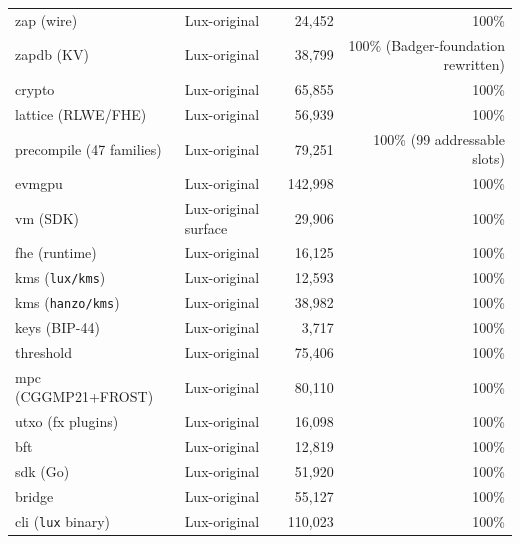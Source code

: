 \documentclass[11pt,a4paper]{article}
\begin{document}
\begin{table}[h]
\begin{tabular}{l l r r}
zap (wire)                 & Lux-original        &  24{,}452 & 100\% \\
zapdb (KV)                 & Lux-original        &  38{,}799 & 100\% (Badger-foundation rewritten) \\
crypto                     & Lux-original        &  65{,}855 & 100\% \\
lattice (RLWE/FHE)         & Lux-original        &  56{,}939 & 100\% \\
precompile (47 families)   & Lux-original        &  79{,}251 & 100\% (99 addressable slots) \\
evmgpu                     & Lux-original        & 142{,}998 & 100\% \\
vm (SDK)                   & Lux-original surface&  29{,}906 & 100\% \\
fhe (runtime)              & Lux-original        &  16{,}125 & 100\% \\
kms (\texttt{lux/kms})     & Lux-original        &  12{,}593 & 100\% \\
kms (\texttt{hanzo/kms})   & Lux-original        &  38{,}982 & 100\% \\
keys (BIP-44)              & Lux-original        &   3{,}717 & 100\% \\
threshold                  & Lux-original        &  75{,}406 & 100\% \\
mpc (CGGMP21+FROST)        & Lux-original        &  80{,}110 & 100\% \\
utxo (fx plugins)          & Lux-original        &  16{,}098 & 100\% \\
bft                        & Lux-original        &  12{,}819 & 100\% \\
sdk (Go)                   & Lux-original        &  51{,}920 & 100\% \\
bridge                     & Lux-original        &  55{,}127 & 100\% \\
cli (\texttt{lux} binary)  & Lux-original        & 110{,}023 & 100\% \\
\bottomrule
\end{tabular}
\end{table}
\end{document}

